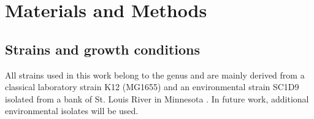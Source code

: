 \chapter{Materials and Methods}

\shorthandoff{-} 

\section{Strains and growth conditions}
All strains used in this work belong to the genus  and are mainly derived from a classical laboratory strain K12 (MG1655) and an environmental strain SC1\textunderscore D9 isolated from a bank of St. Louis River in Minnesota \cite{ishii2006presence}.
In future work, additional environmental isolates will be used.

